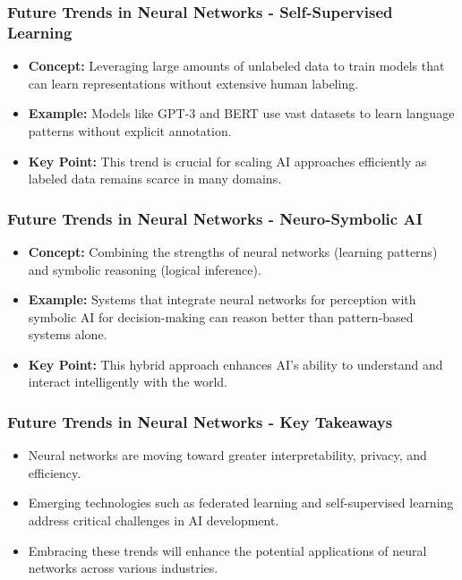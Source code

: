 \documentclass[aspectratio=169]{beamer}
\begin{document}
\begin{frame}[fragile]
    \frametitle{Future Trends in Neural Networks - Self-Supervised Learning}
    \begin{itemize}
        \item \textbf{Concept:} Leveraging large amounts of unlabeled data to train models that can learn representations without extensive human labeling.
        \item \textbf{Example:} Models like GPT-3 and BERT use vast datasets to learn language patterns without explicit annotation.
        \item \textbf{Key Point:} This trend is crucial for scaling AI approaches efficiently as labeled data remains scarce in many domains.
    \end{itemize}
\end{frame}

\begin{frame}[fragile]
    \frametitle{Future Trends in Neural Networks - Neuro-Symbolic AI}
    \begin{itemize}
        \item \textbf{Concept:} Combining the strengths of neural networks (learning patterns) and symbolic reasoning (logical inference).
        \item \textbf{Example:} Systems that integrate neural networks for perception with symbolic AI for decision-making can reason better than pattern-based systems alone.
        \item \textbf{Key Point:} This hybrid approach enhances AI's ability to understand and interact intelligently with the world.
    \end{itemize}
\end{frame}

\begin{frame}[fragile]
    \frametitle{Future Trends in Neural Networks - Key Takeaways}
    \begin{itemize}
        \item Neural networks are moving toward greater interpretability, privacy, and efficiency.
        \item Emerging technologies such as federated learning and self-supervised learning address critical challenges in AI development.
        \item Embracing these trends will enhance the potential applications of neural networks across various industries.
    \end{itemize}
\end{frame}
\end{document}
